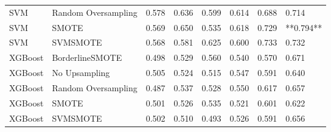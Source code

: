 \begin{tabular}{llllllll}
                         SVM & Random Oversampling & 0.578 &                     0.636 &                 0.599 &                  0.614 &                                   0.688 &     0.714 \\
                         SVM &               SMOTE & 0.569 &                     0.650 &                 0.535 &                  0.618 &                                   0.729 & **0.794** \\
                         SVM &            SVMSMOTE & 0.568 &                     0.581 &                 0.625 &                  0.600 &                                   0.733 &     0.732 \\
                     XGBoost &     BorderlineSMOTE & 0.498 &                     0.529 &                 0.560 &                  0.540 &                                   0.570 &     0.671 \\
                     XGBoost &       No Upsampling & 0.505 &                     0.524 &                 0.515 &                  0.547 &                                   0.591 &     0.640 \\
                     XGBoost & Random Oversampling & 0.487 &                     0.537 &                 0.528 &                  0.550 &                                   0.617 &     0.657 \\
                     XGBoost &               SMOTE & 0.501 &                     0.526 &                 0.535 &                  0.521 &                                   0.601 &     0.622 \\
                     XGBoost &            SVMSMOTE & 0.502 &                     0.510 &                 0.493 &                  0.526 &                                   0.591 &     0.656 \\
\bottomrule
\end{tabular}
